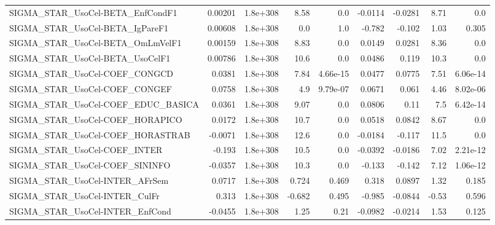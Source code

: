 \begin{tabular}{lrrrrrrrr}
SIGMA\_STAR\_UsoCel-BETA\_EnfCondF1      &     0.00201 &     1.8e+308 &     8.58 &      0.0 &    -0.0114 &     -0.0281 &         8.71 &           0.0 \\
SIGMA\_STAR\_UsoCel-BETA\_IgPareF1       &     0.00608 &     1.8e+308 &      0.0 &      1.0 &     -0.782 &      -0.102 &         1.03 &         0.305 \\
SIGMA\_STAR\_UsoCel-BETA\_OmLmVelF1      &     0.00159 &     1.8e+308 &     8.83 &      0.0 &     0.0149 &      0.0281 &         8.36 &           0.0 \\
SIGMA\_STAR\_UsoCel-BETA\_UsoCelF1       &     0.00786 &     1.8e+308 &     10.6 &      0.0 &     0.0486 &       0.119 &         10.3 &           0.0 \\
SIGMA\_STAR\_UsoCel-COEF\_CONGCD         &      0.0381 &     1.8e+308 &     7.84 & 4.66e-15 &     0.0477 &      0.0775 &         7.51 &      6.06e-14 \\
SIGMA\_STAR\_UsoCel-COEF\_CONGEF         &      0.0758 &     1.8e+308 &      4.9 & 9.79e-07 &     0.0671 &       0.061 &         4.46 &      8.02e-06 \\
SIGMA\_STAR\_UsoCel-COEF\_EDUC\_BASICA    &      0.0361 &     1.8e+308 &     9.07 &      0.0 &     0.0806 &        0.11 &          7.5 &      6.42e-14 \\
SIGMA\_STAR\_UsoCel-COEF\_HORAPICO       &      0.0172 &     1.8e+308 &     10.7 &      0.0 &     0.0518 &      0.0842 &         8.67 &           0.0 \\
SIGMA\_STAR\_UsoCel-COEF\_HORASTRAB      &     -0.0071 &     1.8e+308 &     12.6 &      0.0 &    -0.0184 &      -0.117 &         11.5 &           0.0 \\
SIGMA\_STAR\_UsoCel-COEF\_INTER          &      -0.193 &     1.8e+308 &     10.5 &      0.0 &    -0.0392 &     -0.0186 &         7.02 &      2.21e-12 \\
SIGMA\_STAR\_UsoCel-COEF\_SININFO        &     -0.0357 &     1.8e+308 &     10.3 &      0.0 &     -0.133 &      -0.142 &         7.12 &      1.06e-12 \\
SIGMA\_STAR\_UsoCel-INTER\_AFrSem        &      0.0717 &     1.8e+308 &    0.724 &    0.469 &      0.318 &      0.0897 &         1.32 &         0.185 \\
SIGMA\_STAR\_UsoCel-INTER\_CulFr         &       0.313 &     1.8e+308 &   -0.682 &    0.495 &     -0.985 &     -0.0844 &        -0.53 &         0.596 \\
SIGMA\_STAR\_UsoCel-INTER\_EnfCond       &     -0.0455 &     1.8e+308 &     1.25 &     0.21 &    -0.0982 &     -0.0214 &         1.53 &         0.125 \\

\end{tabular}
